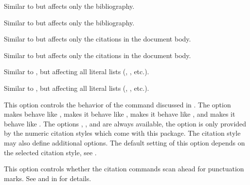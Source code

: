 \documentclass{ltxdockit}[2011/03/25]
\begin{document}
\begin{optionlist}

Similar to  but affects only the bibliography.


Similar to  but affects only the bibliography.


Similar to  but affects only the citations in the document body.


Similar to  but affects only the citations in the document body.


Similar to , but affecting all literal lists (, , etc.).


Similar to , but affecting all literal lists (, , etc.).


This option controls the behavior of the  command discussed in . The  option makes  behave like ,  makes it behave like ,  makes it behave like , and  makes it behave like . The options , , and  are always available, the  option is only provided by the numeric citation styles which come with this package. The citation style may also define additional options. The default setting of this option depends on the selected citation style, see .


This option controls whether the citation commands scan ahead for punctuation marks. See  and  in  for details.



\end{optionlist}
\end{document}
